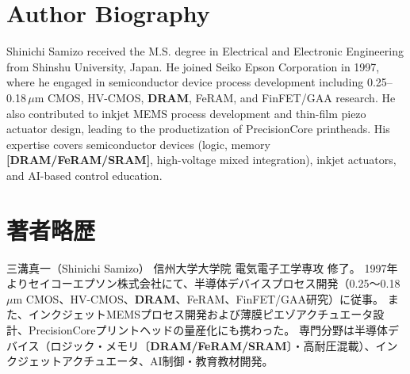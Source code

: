 \documentclass[journal]{IEEEtran}
\begin{document}



\section*{Author Biography}
Shinichi Samizo received the M.S. degree in Electrical and Electronic Engineering from Shinshu University, Japan.  
He joined Seiko Epson Corporation in 1997, where he engaged in semiconductor device process development including 0.25--0.18\,$\mu$m CMOS, HV-CMOS, \textbf{DRAM}, FeRAM, and FinFET/GAA research.  
He also contributed to inkjet MEMS process development and thin-film piezo actuator design, leading to the productization of PrecisionCore printheads.  
His expertise covers semiconductor devices (logic, memory \textbf{[DRAM/FeRAM/SRAM]}, high-voltage mixed integration), inkjet actuators, and AI-based control education.

\section*{著者略歴}
三溝真一（Shinichi Samizo） 信州大学大学院 電気電子工学専攻 修了。  
1997年よりセイコーエプソン株式会社にて、半導体デバイスプロセス開発（0.25～0.18\,$\mu$m CMOS、HV-CMOS、\textbf{DRAM}、FeRAM、FinFET/GAA研究）に従事。  
また、インクジェットMEMSプロセス開発および薄膜ピエゾアクチュエータ設計、PrecisionCoreプリントヘッドの量産化にも携わった。  
専門分野は半導体デバイス（ロジック・メモリ〔\textbf{DRAM/FeRAM/SRAM}〕・高耐圧混載）、インクジェットアクチュエータ、AI制御・教育教材開発。
\end{document}
